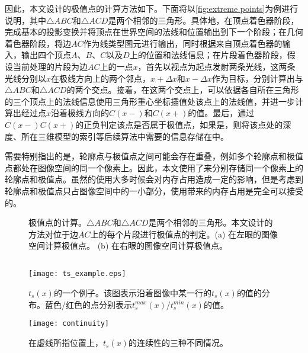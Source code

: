 {因此，本文设计的极值点的计算方法如下。下面将以\autoref{fig:extreme points}为例进行说明，其中$\triangle ABC$和$\triangle ACD$是两个相邻的三角形。具体地，在顶点着色器阶段，完成基本的投影变换并将顶点在世界空间的法线和位置输出到下一个阶段；在几何着色器阶段，将边$AC$作为线类型图元进行输出，同时根据来自顶点着色器的输入，输出四个顶点$A$、$B$、$C$以及$D$上的位置和法线信息；在片段着色器阶段，假设当前处理的片段为边$AC$上的一点$x$，首先以视点为起点发射两条光线，这两条光线分别以$x$在极线方向上的两个邻点，$x+\Delta{x}$和$x-\Delta{x}$作为目标，分别计算出与$\triangle ABC$和$\triangle ACD$的两个交点。接着，在这两个交点上，可以依据各自所在三角形的三个顶点上的法线信息使用三角形重心坐标插值处该点上的法线值，并进一步计算出经过点$x$沿着极线方向的$C(x-)$和$C(x+)$的值。最后，通过$C(x-)C(x+)$的正负判定该点是否属于极值点，如果是，则将该点处的深度、所在三维模型的索引等后续算法中需要的信息存储在\ppll{}中。

需要特别指出的是，轮廓点与极值点之间可能会存在重叠，例如多个轮廓点和极值点都处在图像空间的同一个像素上。因此，本文使用了\ppll{}来分别存储同一个像素上的轮廓点和极值点。虽然\ppll{}的使用大多时候会对内存占用造成一定的影响，但是考虑到轮廓点和极值点只占图像空间中的一小部分，使用\ppll{}带来的内存占用是完全可以接受的。

\begin{figure}[tbh]
    \centering
    \hfil
    \caption{极值点的计算。$\triangle ABC$和$\triangle ACD$是两个相邻的三角形。本文设计的方法对位于边$AC$上的每个片段进行极值点的判定。(a) 在左眼的图像空间计算极值点。 (b) 在右眼的图像空间计算极值点。} \label{fig:extreme points}
\end{figure}

\subsection{\scon{}}

\begin{figure}[tbh]
    \centering
    \texttt{[image: ts\_example.eps]}
    \caption{\label{fig:continuity_example}
    $t_s(x)$的一个例子。该图表示沿着图像中某一行的$t_s(x)$的值的分布。蓝色/红色的点分别表示$t_s^{max}(x)$/$t_s^{min}(x)$的值。}
\end{figure}

\begin{figure}[tbh]
    \centering
    \texttt{[image: continuity]}
    \caption{在虚线所指位置上，$t_s(x)$的连续性的三种不同情况。}
    \label{fig:ts_continuity}
\end{figure}

}

